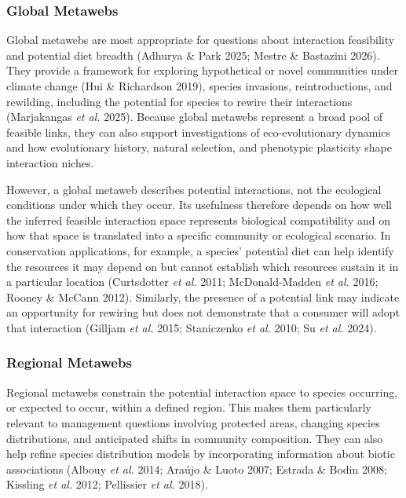 \documentclass[
]{article}
\begin{document}
\subsubsection{Global Metawebs}\label{sec-progress_metaweb}

Global metawebs are most appropriate for questions about interaction
feasibility and potential diet breadth (Adhurya \& Park 2025; Mestre \&
Bastazini 2026). They provide a framework for exploring hypothetical or
novel communities under climate change (Hui \& Richardson 2019), species
invasions, reintroductions, and rewilding, including the potential for
species to rewire their interactions (Marjakangas \emph{et al.} 2025).
Because global metawebs represent a broad pool of feasible links, they
can also support investigations of eco-evolutionary dynamics and how
evolutionary history, natural selection, and phenotypic plasticity shape
interaction niches.

However, a global metaweb describes potential interactions, not the
ecological conditions under which they occur. Its usefulness therefore
depends on how well the inferred feasible interaction space represents
biological compatibility and on how that space is translated into a
specific community or ecological scenario. In conservation applications,
for example, a species' potential diet can help identify the resources
it may depend on but cannot establish which resources sustain it in a
particular location (Curtsdotter \emph{et al.} 2011; McDonald-Madden
\emph{et al.} 2016; Rooney \& McCann 2012). Similarly, the presence of a
potential link may indicate an opportunity for rewiring but does not
demonstrate that a consumer will adopt that interaction (Gilljam
\emph{et al.} 2015; Staniczenko \emph{et al.} 2010; Su \emph{et al.}
2024).

\subsubsection{Regional Metawebs}\label{sec-progress_regional}

Regional metawebs constrain the potential interaction space to species
occurring, or expected to occur, within a defined region. This makes
them particularly relevant to management questions involving protected
areas, changing species distributions, and anticipated shifts in
community composition. They can also help refine species distribution
models by incorporating information about biotic associations (Albouy
\emph{et al.} 2014; Araújo \& Luoto 2007; Estrada \& Bodin 2008;
Kissling \emph{et al.} 2012; Pellissier \emph{et al.} 2018).
\end{document}
